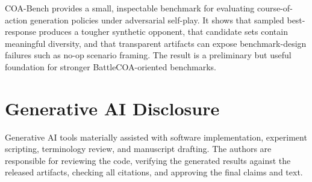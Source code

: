 \documentclass[sigconf]{acmart}
\begin{document}
COA-Bench provides a small, inspectable benchmark for evaluating course-of-action generation policies under adversarial self-play. It shows that sampled best-response produces a tougher synthetic opponent, that candidate sets contain meaningful diversity, and that transparent artifacts can expose benchmark-design failures such as no-op scenario framing. The result is a preliminary but useful foundation for stronger BattleCOA-oriented benchmarks.

\section*{Generative AI Disclosure}
Generative AI tools materially assisted with software implementation, experiment scripting, terminology review, and manuscript drafting. The authors are responsible for reviewing the code, verifying the generated results against the released artifacts, checking all citations, and approving the final claims and text.



\end{document}
